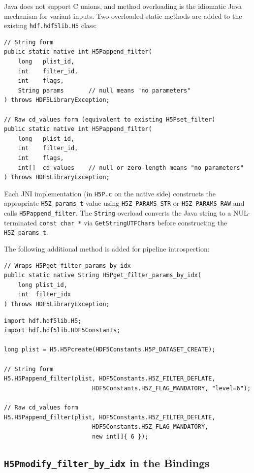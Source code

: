 \documentclass[../RFC-HDFG-2026-001.tex]{subfiles}
\begin{document}
Java does not support C unions, and method overloading is the idiomatic
Java mechanism for variant inputs.  Two overloaded static methods are
added to the existing \texttt{hdf.hdf5lib.H5} class:

\begin{verbatim}
// String form
public static native int H5Pappend_filter(
    long   plist_id,
    int    filter_id,
    int    flags,
    String params       // null means "no parameters"
) throws HDF5LibraryException;

// Raw cd_values form (equivalent to existing H5Pset_filter)
public static native int H5Pappend_filter(
    long   plist_id,
    int    filter_id,
    int    flags,
    int[]  cd_values    // null or zero-length means "no parameters"
) throws HDF5LibraryException;
\end{verbatim}

Each JNI implementation (in \texttt{H5P.c} on the native side) constructs
the appropriate \texttt{H5Z\_params\_t} value using \texttt{H5Z\_PARAMS\_STR}
or \texttt{H5Z\_PARAMS\_RAW} and calls \texttt{H5Pappend\_filter}.
The \texttt{String} overload converts the Java string to a NUL-terminated
\texttt{const char~*} via \texttt{GetStringUTFChars} before constructing
the \texttt{H5Z\_params\_t}.

The following additional method is added for pipeline introspection:

\begin{verbatim}
// Wraps H5Pget_filter_params_by_idx
public static native String H5Pget_filter_params_by_idx(
    long plist_id,
    int  filter_idx
) throws HDF5LibraryException;
\end{verbatim}


\begin{verbatim}
import hdf.hdf5lib.H5;
import hdf.hdf5lib.HDF5Constants;

long plist = H5.H5Pcreate(HDF5Constants.H5P_DATASET_CREATE);

// String form
H5.H5Pappend_filter(plist, HDF5Constants.H5Z_FILTER_DEFLATE,
                         HDF5Constants.H5Z_FLAG_MANDATORY, "level=6");

// Raw cd_values form
H5.H5Pappend_filter(plist, HDF5Constants.H5Z_FILTER_DEFLATE,
                         HDF5Constants.H5Z_FLAG_MANDATORY,
                         new int[]{ 6 });
\end{verbatim}


\subsection{\texttt{H5Pmodify\_filter\_by\_idx} in the Bindings}
\label{sec:modify-bindings}
\end{document}
